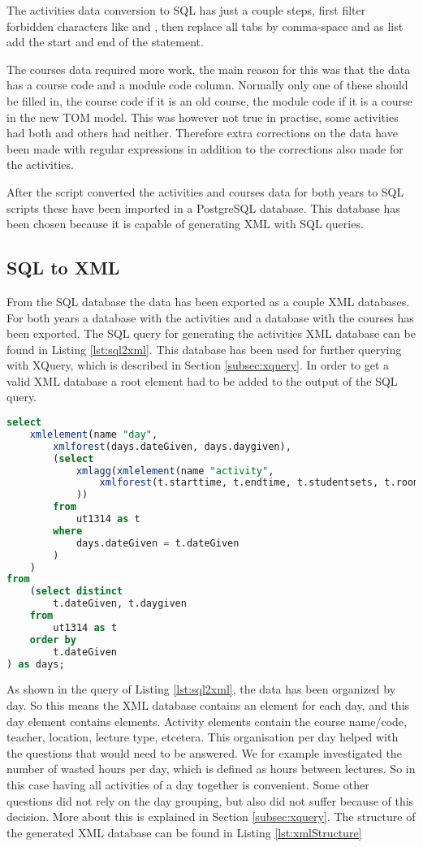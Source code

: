 The activities data conversion to SQL has just a couple steps, first filter forbidden characters like  and , then replace all tabs by comma-space and as list add the start and end of the  statement.

The courses data required more work, the main reason for this was that the data has a course code and a module code column. Normally only one of these should be filled in, the course code if it is an old course, the module code if it is a course in the new TOM model. This was however not true in practise, some activities had both and others had neither. Therefore extra corrections on the data have been made with regular expressions in addition to the corrections also made for the activities.

After the script converted the activities and courses data for both years to SQL scripts these have been imported in a PostgreSQL database. This database has been chosen because it is capable of generating XML with SQL queries.

\subsection{SQL to XML} \label{subsec:sql2xml}
From the SQL database the data has been exported as a couple XML databases. For both years a database with the activities and a database with the courses has been exported. The SQL query for generating the activities XML database can be found in Listing \ref{lst:sql2xml}. This database has been used for further querying with XQuery, which is described in Section \ref{subsec:xquery}. In order to get a valid XML database a root element had to be added to the output of the SQL query.

\begin{lstlisting}[caption=SQL to XML conversion, label=lst:sql2xml, float=htpb, language=sql]
select
	xmlelement(name "day",
		xmlforest(days.dateGiven, days.daygiven),
		(select
			xmlagg(xmlelement(name "activity",
				xmlforest(t.starttime, t.endtime, t.studentsets, t.room, t.coursename, t.teacher)
			))
		from
			ut1314 as t
		where
			days.dateGiven = t.dateGiven
		)
	)
from
	(select distinct
		t.dateGiven, t.daygiven
	from
		ut1314 as t
	order by
		t.dateGiven
) as days;
\end{lstlisting}

As shown in the query of Listing \ref{lst:sql2xml}, the data has been organized by day. So this means the XML database contains an element for each day, and this day element contains  elements. Activity elements contain the course name/code, teacher, location, lecture type, etcetera. This organisation per day helped with the questions that would need to be answered. We for example investigated the number of wasted hours per day, which is defined as hours between lectures. So in this case having all activities of a day together is convenient. Some other questions did not rely on the day grouping, but also did not suffer because of this decision. More about this is explained in Section \ref{subsec:xquery}. The structure of the generated XML database can be found in Listing \ref{lst:xmlStructure}

